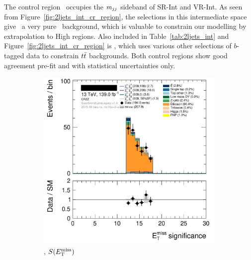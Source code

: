 The control region \crvz\ occupies the $m_{jj}$ sideband of SR-Int and VR-Int.
As seen from Figure~\ref{fig:2ljets_int_cr_region}, the selections in this
intermediate space give \crvz\ a very pure \diboson\ background, which is
valuable to constrain our modelling by extrapolation to High regions.
Also included in Table~\ref{tab:2ljets_int} and
Figure~\ref{fig:2ljets_int_cr_region} is \crtt, which uses various other
selections of $b$-tagged data to constrain $t\bar t$ backgrounds.
Both control regions show good agreement pre-fit and with statistical uncertainties
only.
\begin{figure}[tp]
\centering
\begin{subfigure}{0.495\textwidth}
\centering
\includegraphics[width=\textwidth]{figures/2ljets_def_met_Sign_CRZZ.png}
\caption{\crvz, $S(E_\mathrm{T}^\mathrm{miss})$}
\end{subfigure}
\hfill
\begin{subfigure}{0.495\textwidth}
\centering

\end{subfigure}
\end{figure}
